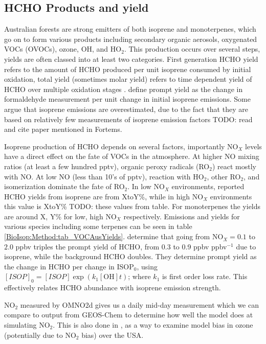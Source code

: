   \subsection{HCHO Products and yield}
    \label{BioIsop:Method:HCHOYield}
    Australian forests are strong emitters of both isoprene and monoterpenes, which go on to form various products including secondary organic aerosols, oxygenated VOCs (OVOCs), ozone, OH, and HO$_2$.
    This production occurs over several steps, yields are often classed into at least two categories.
    First generation HCHO yield refers to the amount of HCHO produced per unit isoprene consumed by initial oxidation, total yield (sometimes molar yield) refers to time dependent yield of HCHO over multiple oxidation stages \parencite{Wolfe2016}.
    \textcite{Wolfe2016} define prompt yield as the change in formaldehyde measurement per unit change in initial isoprene emissions.
    Some argue that isoprene emissions are overestimated, due to the fact that they are based on relatively few measurements of isoprene emission factors \parencite{Winters2009, FortemsCheiney2012} TODO: read and cite paper mentioned in Fortems.
    
    
    Isoprene production of HCHO depends on several factors, importantly NO$_X$ levels have a direct effect on the fate of VOCs in the atmosphere.
    At higher NO mixing ratios (at least a few hundred pptv), organic peroxy radicals (RO$_2$) react mostly with NO. 
    At low NO (less than 10's of pptv), reaction with HO$_2$, other RO$_2$, and isomerization dominate the fate of RO$_2$.
    In low NO$_X$ environments, reported HCHO yields from isoprene are from XtoY\%, while in high NO$_X$ environments this value is XtoY\% TODO: these values from table.
    For monoterpenes the yields are around X, Y\% for low, high NO$_X$ respectively.
    Emissions and yields for various species including some terpenes can be seen in table \ref{BioIsop:Method:tab_VOCAusYields}.
    \textcite{Wolfe2016} determine that going from NO$_X = 0.1$ to $2.0$ ppbv triples the prompt yield of HCHO, from 0.3 to 0.9 ppbv ppbv$^{-1}$ due to isoprene, while the background HCHO doubles.
    They determine prompt yield as the change in HCHO per change in ISOP$_0$, using $[ISOP]_0=[ISOP]\exp(k_1[\mathrm{OH}]t)$; where $k_1$ is first order loss rate.
    This effectively relates HCHO abundance with isoprene emission strength.
    
    NO$_2$ measured by OMNO2d gives us a daily mid-day measurement which we can compare to output from GEOS-Chem to determine how well the model does at simulating NO$_2$.
    This is also done in \textcite{Travis2016}, as a way to examine model bias in ozone (potentially due to NO$_2$ bias) over the USA.
    

